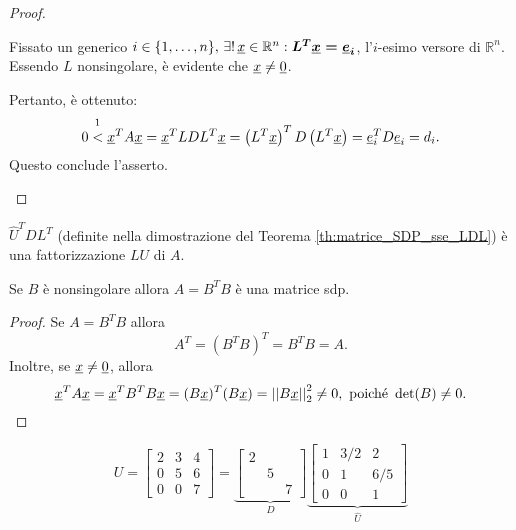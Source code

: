 \begin{proof}
\begin{itemize}
        Fissato un generico $i\in\{1,\hdots, n\},\, \exists!\, \uline x\in\mathbb R^n:\boldsymbol{L^T\uline x=\uline e_i}$, l'$i$-esimo versore di $\mathbb R^n.$  Essendo $L$ nonsingolare, è evidente che $\uline x \neq \uline 0$.
        
        Pertanto, è ottenuto:
        \begin{equation*}
            0\overset{\footnotemark}{<}\uline x^T A\uline x = \uline x^T LDL^T \uline x = \left(L^T \uline x\right)^T D \left(L^T \uline x\right) = \uline e_i^T D \uline e_i = d_i.
        \end{equation*}
        Questo conclude l'asserto.
    \end{itemize}
\end{proof}

\addtocounter{footnote}{-1}


\begin{remark}
    $\widehat U^TD L^T$ (definite nella dimostrazione del Teorema \ref{th:matrice_SDP_sse_LDL}) è una fattorizzazione $LU$ di $A$.
\end{remark}

\begin{theorem}
	Se $B$ è nonsingolare allora $A=B^TB$ è una matrice sdp.
\end{theorem}
\begin{proof}
	Se $A=B^TB$ allora
	\begin{equation*}
		A^T=(B^TB)^T=B^TB=A.
	\end{equation*}
	Inoltre, se $\uline x\neq\uline 0$, allora
	\begin{equation*}
		\uline x^T A \uline x = \uline x^T B^T B \uline x = (B\uline x)^T(B\uline x) = \left|\left| B\uline x \right|\right|_2^2\neq 0, \text{ poiché } \det(B)\neq 0.
	\end{equation*}
\end{proof}

\begin{example}
    \begin{equation*}
        U =
        \begin{bmatrix}
            2 & 3 & 4\\
            0 & 5 & 6\\
            0 & 0 & 7
        \end{bmatrix} = 
        \underbrace{
        \begin{bmatrix}
            2 & & \\
            & 5 &\\
            & & 7
        \end{bmatrix}}_{D}
        \underbrace{
        \begin{bmatrix}
            1 & 3/2 & 2\\
            0 & 1 & 6/5\\
            0 & 0 & 1
        \end{bmatrix}}_{\widehat U}
    \end{equation*}
\end{example}

